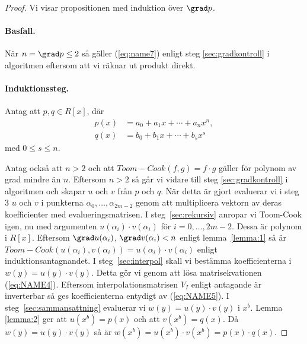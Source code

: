 \begin{proof}
Vi visar propositionen med induktion över $\grad p$.

\paragraph{Basfall.}
När $n = \grad p \leq 2$ så gäller (\ref{eq:name7}) enligt steg
\ref{sec:gradkontroll} i algoritmen eftersom att vi räknar ut produkt direkt.

\paragraph{Induktionssteg.}
\label{sec:induktion}
Antag att $p, q \in R[x]$, där
\begin{align*}
  p(x) &= a_0 + a_1 x + \cdots + a_n x^n, \\
  q(x) &= b_0 + b_1 x + \cdots + b_s x^s
\end{align*}
med $0 \leq s \leq n$.

\bigskip\noindent
Antag också att $n > 2$ och att $Toom-Cook (f, g) =  f \cdot g$ gäller för polynom
av grad mindre än $n$. Eftersom $n > 2$ så går vi vidare till steg
\ref{sec:gradkontroll} i algoritmen och skapar $u$ och $v$ från $p$ och $q$. När
detta är gjort evaluerar vi i steg 3 $u$ och $v$ i punkterna $\alpha_0, \dots,
\alpha_{2m-2}$ genom att multiplicera vektorn av deras koefficienter med
evalueringsmatrisen. I steg~\ref{sec:rekursiv} anropar vi Toom-Cook igen, nu med
argumenten $u(\alpha_i) \cdot v(\alpha_i)$ för $i = 0, \ldots , 2m-2$. Dessa är
polynom i $R[x]$. Eftersom $\grad u(\alpha_i)$, $\grad v(\alpha_i) < n$ enligt
lemma~\ref{lemma:1} så är $Toom-Cook (u(\alpha_i), v(\alpha_i)) = u(\alpha_i) \cdot
v(\alpha_i)$ enligt induktionsantagnandet. I steg~\ref{sec:interpol} skall vi
bestämma koefficienterna i $w(y)=u(y) \cdot v(y)$. Detta gör vi genom att lösa
matrisekvationen (\ref{eq:NAME4}). Eftersom interpolationsmatrisen $V_I$ enligt
antagande är inverterbar så ges koefficienterna entydigt av (\ref{eq:NAME5}). I
steg~\ref{sec:sammansattning} evaluerar vi $w(y)=u(y) \cdot v(y)$ i $x^b$. Lemma
\ref{lemma:2} ger att $u(x^b)=p(x)$ och att $v(x^b)=q(x)$. Då $w(y)=u(y) \cdot
v(y)$ så är $w(x^b)=u(x^b) \cdot v(x^b)=p(x) \cdot q(x)$.
\end{proof}

